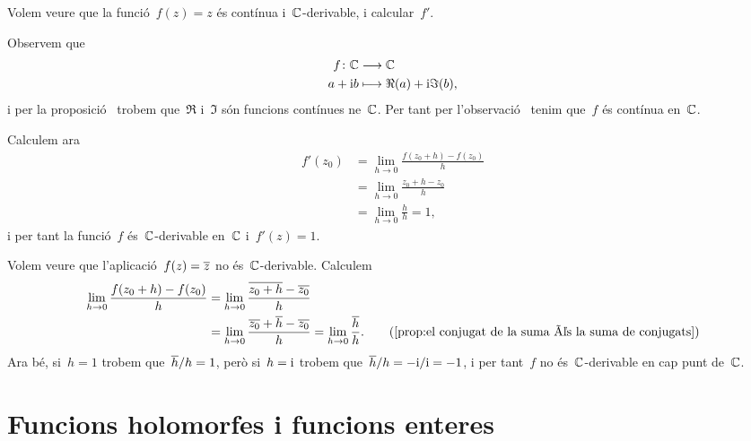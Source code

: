 \documentclass[../Apunts.tex]{subfiles}
\begin{document}
	\begin{example}
		\label{ex:la funció identitat és entera}
		Volem veure que la funció~\(f(z)=z\) és contínua i~\(\mathbb{C}\)-derivable, i calcular~\(f'\).
	\end{example}
	\begin{solution}
		Observem que
		\begin{align*}
			f\colon\mathbb{C}&\longrightarrow\mathbb{C} \\
			a+\mathrm{i} b&\longmapsto \Re(a)+\mathrm{i}\Im(b),
		\end{align*}
		i per la proposició~ trobem que~\(\Re\) i~\(\Im\) són funcions contínues ne~\(\mathbb{C}\). Per tant per l'observació~ tenim que~\(f\) és contínua en~\(\mathbb{C}\).
		
		Calculem ara
		\begin{align*}
			f'(z_{0})&=\lim_{h\to0}\frac{f(z_{0}+h)-f(z_{0})}{h} \\
			&=\lim_{h\to0}\frac{z_{0}+h-z_{0}}{h} \\
			&=\lim_{h\to0}\frac{h}{h}=1,
		\end{align*}
		i per tant la funció~\(f\) és~\(\mathbb{C}\)-derivable en~\(\mathbb{C}\) i~\(f'(z)=1\).
	\end{solution}
	\begin{example}
		Volem veure que l'aplicació~\(f(z)=\overline{z}\) no és~\(\mathbb{C}\)-derivable. Calculem
		\begin{align*}
			\lim_{h\to0}\frac{f(z_{0}+h)-f(z_{0})}{h}&=\lim_{h\to0}\frac{\conjugat{z_{0}+h}-\conjugat{z_{0}}}{h} \\
			&=\lim_{h\to0}\frac{\conjugat{z_{0}}+\conjugat{h}-\conjugat{z_{0}}}{h}=\lim_{h\to0}\frac{\conjugat{h}}{h}. \tag{\ref{prop:el conjugat de la suma és la suma de conjugats}}
		\end{align*}
		Ara bé, si~\(h=1\) trobem que~\(\overline{h}/h=1\), però si~\(h=\mathrm{i}\) trobem que~\(\overline{h}/h=-\mathrm{i}/\mathrm{i}=-1\), i per tant~\(f\) no és~\(\mathbb{C}\)-derivable en cap punt de~\(\mathbb{C}\).
	\end{example}
\section{Funcions holomorfes i funcions enteres}
\end{document}
